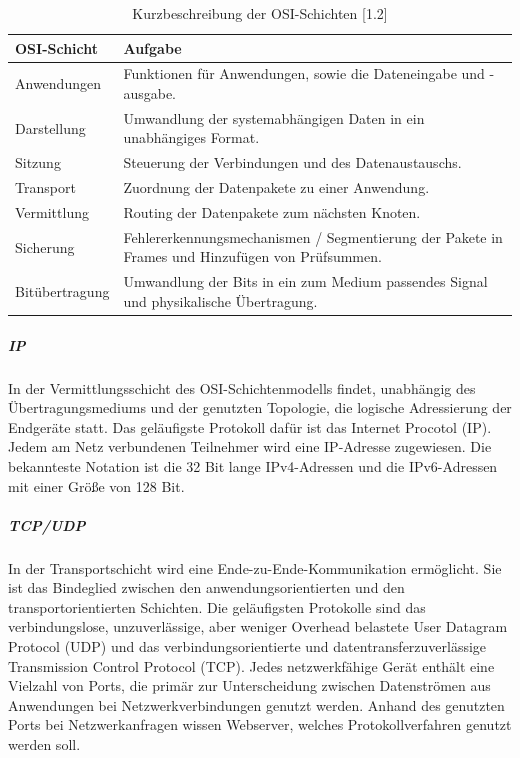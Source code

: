 \newpage

\begin{table}[]
\begin{center}
    \begin{tabular}{| l | p{8cm} |}
    \hline
     OSI-Schicht & Aufgabe \\ 
     \hline
        
       Anwendungen & Funktionen für Anwendungen, sowie die Dateneingabe und -ausgabe. \\
    \hline    
       Darstellung & Umwandlung der systemabhängigen Daten in ein unabhängiges Format.  \\
    \hline   
       Sitzung & Steuerung der Verbindungen und des Datenaustauschs.  \\
    \hline  
        Transport & Zuordnung der Datenpakete zu einer Anwendung. \\ 
    
    \hline     
    	Vermittlung & Routing der Datenpakete zum nächsten Knoten. \\
	
    \hline       
      Sicherung & Fehlererkennungsmechanismen / Segmentierung der Pakete in Frames und Hinzufügen von Prüfsummen.  \\   
    \hline
    
    Bitübertragung & Umwandlung der Bits in ein zum Medium passendes Signal und physikalische Übertragung.\\ 
    \hline    
    \end{tabular}
\end{center}
\caption{Kurzbeschreibung der OSI-Schichten [1.2]}
\end{table}

\subparagraph{IP}
In der Vermittlungsschicht des OSI-Schichtenmodells findet, unabhängig des Über\-tra\-gungs\-mediums und der genutzten Topologie, die logische Adressierung der Endgeräte statt. Das geläufigste Protokoll dafür ist das Internet Procotol (IP). Jedem am Netz verbundenen Teilnehmer wird eine IP-Adresse zugewiesen. Die bekannteste Notation ist die 32 Bit lange IPv4-Adressen und die IPv6-Adressen mit einer Größe von 128 Bit. 
\newline

\subparagraph{TCP/UDP}
In der Transportschicht wird eine Ende-zu-Ende-Kommunikation ermöglicht. Sie ist das Bindeglied zwischen den anwendungsorientierten und den transportorientierten Schichten. Die geläufigsten Protokolle sind das verbindungslose, unzuverlässige, aber weniger Overhead belastete User Datagram Protocol (UDP) und das verbindungsorientierte und datentransferzuverlässige Transmission Control Protocol (TCP). Jedes netzwerkfähige Gerät enthält eine Vielzahl von Ports, die primär zur
Unterscheidung zwischen Datenströmen aus Anwendungen bei Netzwerkverbindungen
genutzt werden. Anhand des genutzten Ports bei Netzwerkanfragen
wissen Webserver, welches Protokollverfahren genutzt werden soll.

